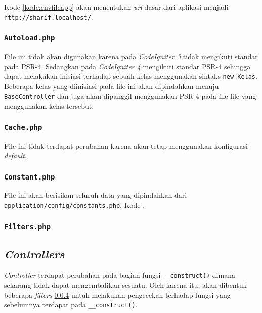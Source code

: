 Kode \ref{kode:envfileapp} akan menentukan \textit{url} dasar dari aplikasi menjadi \texttt{http://sharif.localhost/}.

\subsubsection{\texttt{Autoload.php}}
File ini tidak akan digunakan karena pada \textit{CodeIgniter 3} tidak mengikuti standar pada PSR-4. Sedangkan pada \textit{CodeIgniter 4} mengikuti standar PSR-4 sehingga dapat melakukan inisiasi terhadap sebuah kelas menggunakan sintaks \texttt{new Kelas}. Beberapa kelas yang diinisiasi pada file ini akan dipindahkan menuju \texttt{BaseController} dan juga akan dipanggil menggunakan PSR-4 pada file-file yang menggunakan kelas tersebut.

\subsubsection{\texttt{Cache.php}}
File ini tidak terdapat perubahan karena akan tetap menggunakan konfigurasi \textit{default}.

\subsubsection{\texttt{Constant.php}}
File ini akan berisikan seluruh data yang dipindahkan dari \texttt{application/config/constants.php}. Kode .

\subsubsection{\texttt{Filters.php}}
\label{subsubsec:filters}

\subsection{\textit{Controllers}}
\textit{Controller} terdapat perubahan pada bagian fungsi \texttt{\_\_construct()} dimana sekarang tidak dapat mengembalikan sesuatu. Oleh karena itu, akan dibentuk beberapa \textit{filters} \ref{subsubsec:filters} untuk melakukan pengecekan terhadap fungsi yang sebelumnya terdapat pada \texttt{\_\_construct()}.
